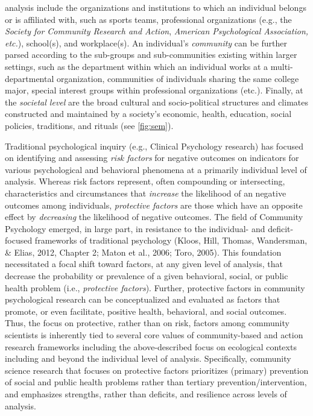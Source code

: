 \documentclass[11pt,]{tufte-book}
\begin{document}
analysis include the organizations and institutions to which an
individual belongs or is affiliated with, such as sports teams,
professional organizations (e.g., the \emph{Society for Community
Research and Action}, \emph{American Psychological Association, etc.}),
school(s), and workplace(s). An individual's \emph{community} can be
further parsed according to the sub-groups and sub-communities existing
within larger settings, such as the department within which an
individual works at a multi-departmental organization, communities of
individuals sharing the same college major, special interest groups
within professional organizations (etc.). Finally, at the \emph{societal
level} are the broad cultural and socio-political structures and
climates constructed and maintained by a society's economic, health,
education, social policies, traditions, and rituals (see
\cref{fig:sem}).


Traditional psychological inquiry (e.g., Clinical Psychology research)
has focused on identifying and assessing \emph{risk factors} for
negative outcomes on indicators for various psychological and behavioral
phenomena at a primarily individual level of analysis. Whereas risk
factors represent, often compounding or intersecting, characteristics
and circumstances that \emph{increase} the likelihood of an negative
outcomes among individuals, \emph{protective factors} are those which
have an opposite effect by \emph{decreasing} the likelihood of negative
outcomes. The field of Community Psychology emerged, in large part, in
resistance to the individual- and deficit-focused frameworks of
traditional psychology (Kloos, Hill, Thomas, Wandersman, \& Elias, 2012,
Chapter 2; Maton et al., 2006; Toro, 2005). This foundation necessitated
a focal shift toward factors, at any given level of analysis, that
decrease the probability or prevalence of a given behavioral, social, or
public health problem (i.e., \emph{protective factors}). Further,
protective factors in community psychological research can be
conceptualized and evaluated as factors that promote, or even
facilitate, positive health, behavioral, and social outcomes. Thus, the
focus on protective, rather than on risk, factors among community
scientists is inherently tied to several core values of community-based
and action research frameworks including the above-described focus on
ecological contexts including and beyond the individual level of
analysis. Specifically, community science research that focuses on
protective factors prioritizes (primary) prevention of social and public
health problems rather than tertiary prevention/intervention, and
emphasizes strengths, rather than deficits, and resilience across levels
of analysis.
\end{document}
